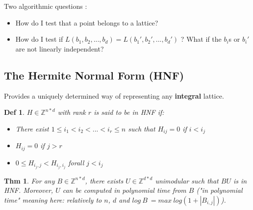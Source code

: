 \documentclass[11pt]{article}
\newtheorem{definition}{Def}
\newtheorem{theorem}{Thm}
\begin{document}
Two algorithmic questions :

\begin{itemize}
\item How do I test that a point belongs to a lattice?
\item How do I test if $L(b_1,b_2,...,b_d)=L(b_1',b_2',...,b_d')$ ? What if the $b_i$s or $b_i'$ are not linearly independent?
\end{itemize}

\subsection{The Hermite Normal Form (HNF)}
Provides a uniquely determined way of representing any \textbf{integral} lattice.

\begin{definition}
$H \in \mathbb{Z}^{n*d}$ with rank $r$ is said to be in HNF if:
\begin{itemize}
\item There exist $1 \leq i_1 < i_2 < ... < i_r \leq n$ such that $H_{ij}=0$ if $i < i_j$
\item $H_{ij} =0$ if $j>r$
\item $0 \leq H_{i_j,j} < H_{i_j,i_j}$ forall $j < i_j$
\end{itemize}
\end{definition}

\begin{theorem}
For any $B \in \mathbb{Z}^{n*d}$, there exists $U \in \mathbb{Z}^{d*d}$ unimodular such that $B U$ is in HNF. Moreover, $U$ can be computed in polynomial time from $B$ ("in polynomial time" meaning here: relatively to $n$, $d$ and $log \ B \ = max \ log(1+|B_{i,j}|)$).
\end{theorem}
\end{document}
